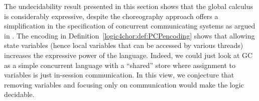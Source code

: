 \begin{remark}\label{logic4chor:remark:vars}
  The undecidability result presented in this section shows that the
  global calculus is considerably expressive, despite the choreography
  approach offers a simplification in the specification of concurrent
  communicating systems as argued in \cite{carbone7scc}. The encoding
  in Definition~\ref{logic4chor:def:PCPencoding} shows that allowing state
  variables (hence local variables that can be accessed by various
  threads) increases the expressive power of the language. Indeed, we
  could just look at GC as a simple concurrent language with a
  ``shared'' store where assignment to variables is just in-session
  communication. In this view, we conjecture that removing variables
  and focusing only on communication would make the logic decidable.
\end{remark}

